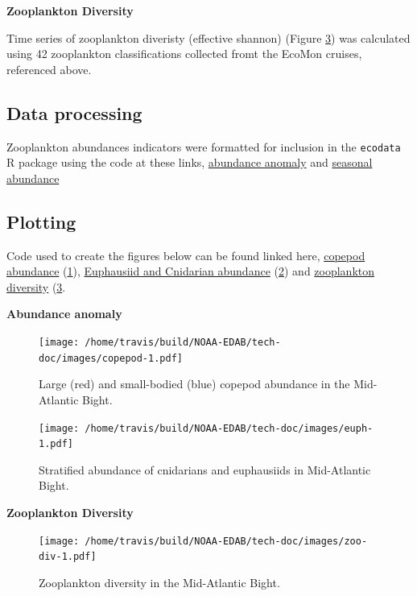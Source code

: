 \documentclass[
]{book}
\begin{document}
\textbf{Zooplankton Diversity}

Time series of zooplankton diveristy (effective shannon) (Figure \ref{fig:zoo-div}) was calculated using 42 zooplankton classifications collected fromt the EcoMon cruises, referenced above.

\hypertarget{data-processing-31}{%
\subsection{Data processing}\label{data-processing-31}}

Zooplankton abundances indicators were formatted for inclusion in the \texttt{ecodata} R package using the code at these links, \href{https://github.com/NOAA-EDAB/ecodata/blob/master/data-raw/get_zoo_abun_anom.R}{abundance anomaly} and \href{https://github.com/NOAA-EDAB/ecodata/blob/master/data-raw/get_zoo_oi.R}{seasonal abundance}

\hypertarget{plotting-38}{%
\subsection{Plotting}\label{plotting-38}}

Code used to create the figures below can be found linked here, \href{https://github.com/NOAA-EDAB/ecodata/blob/master/chunk-scripts/LTL.Rmd-MAB-zoo-abund.R}{copepod abundance} (\ref{fig:copepod}), \href{https://github.com/NOAA-EDAB/ecodata/blob/master/chunk-scripts/LTL.Rmd-MAB-euph-cnid.R}{Euphausiid and Cnidarian abundance} (\ref{fig:euph}) and \href{https://github.com/NOAA-EDAB/ecodata/blob/master/chunk-scripts//LTL.Rmd-MAB-zoo-abund1.R}{zooplankton diversity} (\ref{fig:zoo-div}.

\textbf{Abundance anomaly}

\begin{figure}
\centering
\texttt{[image: /home/travis/build/NOAA-EDAB/tech-doc/images/copepod-1.pdf]}
\caption{\label{fig:copepod}Large (red) and small-bodied (blue) copepod abundance in the Mid-Atlantic Bight.}
\end{figure}

\begin{figure}
\centering
\texttt{[image: /home/travis/build/NOAA-EDAB/tech-doc/images/euph-1.pdf]}
\caption{\label{fig:euph}Stratified abundance of cnidarians and euphausiids in Mid-Atlantic Bight.}
\end{figure}

\textbf{Zooplankton Diversity}

\begin{figure}
\centering
\texttt{[image: /home/travis/build/NOAA-EDAB/tech-doc/images/zoo-div-1.pdf]}
\caption{\label{fig:zoo-div}Zooplankton diversity in the Mid-Atlantic Bight.}
\end{figure}
\end{document}
